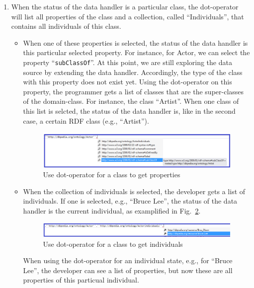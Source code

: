 \documentclass{llncs} %
\begin{document}
\begin{enumerate}
			
  \item When the status of the data handler is a particular class,
		the dot-operator will list all properties of the class and a collection,
		called ``Individuals'', that contains all individuals of this class.
		 \begin{itemize}
			 \item When one of these properties is selected, the status of the data handler is this
			   particular selected property. For instance, for Actor, we can select the
				  property ``\texttt{subClassOf}''. At this point, we are still
						exploring the data source by extending the data handler. Accordingly,
						the type of the class with this property does not exist yet.
						Using the dot-operator on this property, the programmer gets a list of classes
					 that are the super-classes of the domain-class. For instance, the class ``Artist''.
					 When one class of this list is selcted, the status of the data handler is,
					 like in the second case, a certain RDF class (e.g., ``Artist'').
			\begin{figure}[h]
				\centering
			\includegraphics[width=0.99\linewidth]{./figs/getProp.png}
			\caption{Use dot-operator for a class to get properties}
			\label{fig:showProp}
			\end{figure}
					
				
					
				\item When the collection of individuals is selected, the developer gets
					a list of individuals. If one is selected, e.g., ``Bruce Lee'', the
					status of the data handler is the current individual, as examplified in Fig.~\ref{fig:showInd}.
			   \begin{figure}[h]
				 \centering
			   \includegraphics[width=0.99\linewidth]{./figs/getInd.png}
			     \caption{Use dot-operator for a class to get individuals}
		   	\label{fig:showInd}
		   	\end{figure}
					
					
					When using the dot-operator for an individual state,
					 e.g., for ``Bruce Lee'', the developer can see a list of properties,
					but now these are all properties of this particual individual.
		 \end{itemize}
\end{enumerate}
\end{document}
